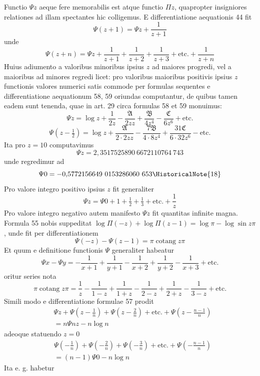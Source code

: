Functio $\Psi z$ aeque fere memorabilis est atque functio $\Pi z$, quapropter insigniores relationes ad illam spectantes hic colligemus. E differentiatione aequationis 44 fit
\[
\Psi(z+1)=\Psi z+\frac{1}{z+1}\tag*{[63]}
\]
unde
\[
\Psi(z+n)=\Psi z+\frac{1}{z+1}+\frac{1}{z+2}+\frac{1}{z+3}+\text{etc.}+\frac{1}{z+n}\tag*{[64]}
\]
Huius adiumento a valoribus minoribus ipsius $z$ ad maiores progredi, vel a maioribus ad minores regredi licet: pro valoribus maioribus positivis ipsius $z$ functionis valores numerici satis commode per formulas sequentes e differentiatione aequationum 58, 59 oriundas computantur, de quibus tamen eadem sunt tenenda, quae in art. 29 circa formulas 58 et 59 monuimus:
\[
\Psi z=\log z+\frac{1}{2z}-\frac{\mathfrak{A}}{2zz}+\frac{\mathfrak{B}}{4z^4}-\frac{\mathfrak{C}}{6z^6}+\text{etc.}\tag*{[65]}
\]
\[
\Psi\left(z-\tfrac12\right)=\log z+\frac{\mathfrak{A}}{2\cdot2zz}-\frac{7\mathfrak{B}}{4\cdot8z^4}+\frac{31\mathfrak{C}}{6\cdot32z^6}-\text{etc.}\tag*{[66]}
\]
Ita pro $z=10$ computavimus
\[
\Psi z=2{,}3517525890\ 6672110764\ 743
\]
unde regredimur ad
\[
\Psi0=-0{,}5772156649\ 0153286060\ 653\HistoricalNote{18}
\]
Pro valore integro positivo ipsius $z$ fit generaliter
\[
\Psi z=\Psi0+1+\tfrac12+\tfrac13+\text{etc.}+\frac1z\tag*{[67]}
\]
Pro valore integro negativo autem manifesto $\Psi z$ fit quantitas infinite magna.
Formula 55 nobis suppeditat $\log\Pi(-z)+\log\Pi(z-1)=\log\pi-\log\sin z\pi$, unde fit per differentiationem
\[
\Psi(-z)-\Psi(z-1)=\pi\operatorname{cotang}z\pi\tag*{[68]}
\]
Et quum e definitione functionis $\Psi$ generaliter habeatur
\[
\Psi x-\Psi y=-\frac1{x+1}+\frac1{y+1}-\frac1{x+2}+\frac1{y+2}-\frac1{x+3}+\text{etc.}\tag*{[69]}
\]
oritur series nota
\[
\pi\operatorname{cotang}z\pi=\frac1z-\frac1{1-z}+\frac1{1+z}-\frac1{2-z}+\frac1{2+z}-\frac1{3-z}+\text{etc.}
\]
Simili modo e differentiatione formulae 57 prodit
\[
\begin{aligned}
&\Psi z+\Psi\left(z-\frac1n\right)+\Psi\left(z-\frac2n\right)+\text{etc.}+\Psi\left(z-\frac{n-1}{n}\right)\\[4pt]
&=n\Psi nz-n\log n
\end{aligned}
\tag*{[70]}\]
adeoque statuendo $z=0$
\[
\begin{aligned}
&\Psi\left(-\frac1n\right)+\Psi\left(-\frac2n\right)+\Psi\left(-\frac3n\right)+\text{etc.}+\Psi\left(-\frac{n-1}{n}\right)\\[4pt]
&=(n-1)\Psi0-n\log n
\end{aligned}
\tag*{[71]}\]
Ita e. g. habetur
